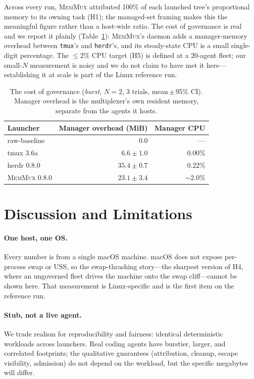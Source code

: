 \documentclass[11pt]{article}
\newcommand{\sys}{\textsc{MemMux}}
\newcommand{\code}[1]{\texttt{#1}}
\begin{document}
Across every run, \sys{} attributed 100\% of each launched tree's proportional memory to its owning
task (H1); the managed-set framing makes this the meaningful figure rather than a host-wide ratio.
The cost of governance is real and we report it plainly (Table~\ref{tab:cost}): \sys{}'s daemon adds
a manager-memory overhead between \code{tmux}'s and \code{herdr}'s, and its steady-state CPU is a
small single-digit percentage. The $\leq 2\%$ CPU target (H5) is defined at a 20-agent fleet; our
small-$N$ measurement is noisy and we do not claim to have met it here---establishing it at scale is
part of the Linux reference run.

\begin{table}[t]
\centering\small
\begin{tabular}{@{}lrr@{}}
\toprule
Launcher & Manager overhead (MiB) & Manager CPU \\
\midrule
raw-baseline & 0.0            & --- \\
tmux 3.6a    & $6.6\pm1.0$    & 0.00\% \\
herdr 0.8.0  & $35.4\pm0.7$   & 0.22\% \\
\sys{} 0.8.0 & $23.1\pm3.4$   & $\sim$2.0\% \\
\bottomrule
\end{tabular}
\caption{The cost of governance (\emph{burst}, $N{=}2$, 3 trials, mean\,$\pm$\,95\% CI). Manager
overhead is the multiplexer's own resident memory, separate from the agents it hosts.}
\label{tab:cost}
\end{table}

\section{Discussion and Limitations}
\label{sec:limits}

\paragraph{One host, one OS.} Every number is from a single macOS machine. macOS does not expose
per-process swap or USS, so the swap-thrashing story---the sharpest version of H4, where an
ungoverned fleet drives the machine onto the swap cliff---cannot be shown here. That measurement is
Linux-specific and is the first item on the reference run.

\paragraph{Stub, not a live agent.} We trade realism for reproducibility and fairness: identical
deterministic workloads across launchers. Real coding agents have burstier, larger, and correlated
footprints; the qualitative guarantees (attribution, cleanup, escape visibility, admission) do not
depend on the workload, but the specific megabytes will differ.
\end{document}
